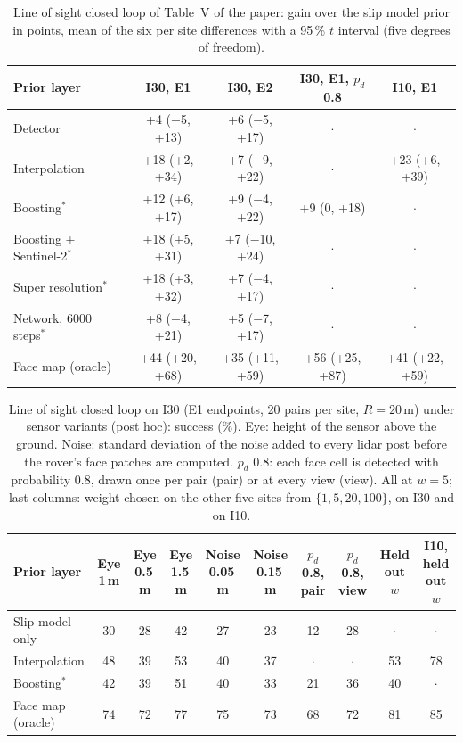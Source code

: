 \documentclass[10pt]{article}
\begin{document}
\begin{table}[H]
\caption{Line of sight closed loop of Table~V of the paper: gain over the slip model prior in points, mean of the six per site differences with a 95\,\% $t$ interval (five degrees of freedom).}
\label{tab:lossite}
\centering\scriptsize
\begin{tabular}{@{}lcccc@{}}
\toprule
Prior layer & I30, E1 & I30, E2 & I30, E1, $p_d$ 0.8 & I10, E1 \\
\midrule
Detector & +4 ($-$5, +13) & +6 ($-$5, +17) & $\cdot$ & $\cdot$ \\
Interpolation & +18 (+2, +34) & +7 ($-$9, +22) & $\cdot$ & +23 (+6, +39) \\
Boosting$^{*}$ & +12 (+6, +17) & +9 ($-$4, +22) & +9 (0, +18) & $\cdot$ \\
Boosting + Sentinel-2$^{*}$ & +18 (+5, +31) & +7 ($-$10, +24) & $\cdot$ & $\cdot$ \\
Super resolution$^{*}$ & +18 (+3, +32) & +7 ($-$4, +17) & $\cdot$ & $\cdot$ \\
Network, 6000 steps$^{*}$ & +8 ($-$4, +21) & +5 ($-$7, +17) & $\cdot$ & $\cdot$ \\
Face map (oracle) & +44 (+20, +68) & +35 (+11, +59) & +56 (+25, +87) & +41 (+22, +59) \\
\bottomrule
\end{tabular}
\end{table}

\begin{table}[H]
\caption{Line of sight closed loop on I30 (E1 endpoints, 20 pairs per site, $R=20$\,m) under sensor variants (post hoc): success (\%). Eye: height of the sensor above the ground. Noise: standard deviation of the noise added to every lidar post before the rover's face patches are computed. $p_d$ 0.8: each face cell is detected with probability 0.8, drawn once per pair (pair) or at every view (view). All at $w=5$; last columns: weight chosen on the other five sites from $\{1,5,20,100\}$, on I30 and on I10.}
\label{tab:clvariants}
\centering\scriptsize
\setlength{\tabcolsep}{2.6pt}
\begin{tabular}{@{}lccccccccc@{}}
\toprule
Prior layer & Eye 1\,m & Eye 0.5\,m & Eye 1.5\,m & Noise 0.05\,m & Noise 0.15\,m & $p_d$ 0.8, pair & $p_d$ 0.8, view & Held out $w$ & I10, held out $w$ \\
\midrule
Slip model only & 30 & 28 & 42 & 27 & 23 & 12 & 28 & $\cdot$ & $\cdot$ \\
Interpolation & 48 & 39 & 53 & 40 & 37 & $\cdot$ & $\cdot$ & 53 & 78 \\
Boosting$^{*}$ & 42 & 39 & 51 & 40 & 33 & 21 & 36 & 40 & $\cdot$ \\
Face map (oracle) & 74 & 72 & 77 & 75 & 73 & 68 & 72 & 81 & 85 \\
\bottomrule
\end{tabular}
\end{table}
\end{document}
